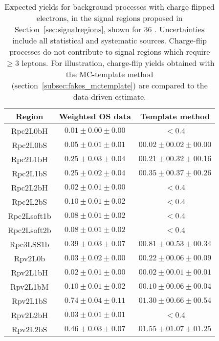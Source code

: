 \begin{table}[!htb]
\caption{Expected yields for background processes with charge-flipped electrons,
in the signal regions proposed in Section~\ref{sec:signalregions}, shown for 36 \ifb. 
Uncertainties include all statistical and systematic sources. 
Charge-flip processes do not contribute to signal regions which require $\ge 3$ leptons. 
For illustration, charge-flip yields obtained with the MC-template method (section~\ref{subsec:fakes_mctemplate}) are compared to the data-driven estimate. 
}
\label{tab:chargeflip_sr_yields}
\centering
\begin{tabular}{|c||c|c|}\hline
 Region      &   Weighted OS data          &     Template method \\\hline
    Rpc2L0bH & $ 0.01 \pm  0.00 \pm  0.00$ & $<0.4$ \\
    Rpc2L0bS & $ 0.05 \pm  0.01 \pm  0.01$ & $ 00.02 \pm 00.02 \pm 00.00 $ \\
    Rpc2L1bH & $ 0.25 \pm  0.03 \pm  0.04$ & $ 00.21 \pm 00.32 \pm 00.16 $ \\
    Rpc2L1bS & $ 0.25 \pm  0.02 \pm  0.04$ & $ 00.35 \pm 00.37 \pm 00.26 $ \\
    Rpc2L2bH & $ 0.02 \pm  0.01 \pm  0.00$ & $<0.4$ \\
    Rpc2L2bS & $ 0.10 \pm  0.01 \pm  0.02$ & $<0.4$ \\
 Rpc2Lsoft1b & $ 0.08 \pm  0.01 \pm  0.02$ & $<0.4$ \\
 Rpc2Lsoft2b & $ 0.08 \pm  0.01 \pm  0.02$ & $<0.4$ \\
   Rpc3LSS1b & $ 0.39 \pm  0.03 \pm  0.07$ & $ 00.81 \pm 00.53 \pm 00.34 $ \\
     Rpv2L0b & $ 0.03 \pm  0.02 \pm  0.00$ & $ 00.22 \pm 00.06 \pm 00.09 $ \\
    Rpv2L1bH & $ 0.02 \pm  0.01 \pm  0.00$ & $ 00.02 \pm 00.01 \pm 00.01 $ \\
    Rpv2L1bM & $ 0.10 \pm  0.01 \pm  0.02$ & $ 00.10 \pm 00.06 \pm 00.04 $ \\
    Rpv2L1bS & $ 0.74 \pm  0.04 \pm  0.11$ & $ 01.30 \pm 00.66 \pm 00.54 $ \\
    Rpv2L2bH & $ 0.03 \pm  0.01 \pm  0.01$ & $<0.4$ \\
    Rpv2L2bS & $ 0.46 \pm  0.03 \pm  0.07$ & $ 01.55 \pm 01.07 \pm 01.25 $ \\
\hline
\hline
\end{tabular}
\end{table}
